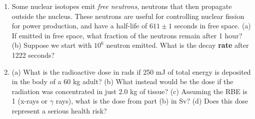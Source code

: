 \documentclass[12pt,twocolumn]{article}
\begin{document}
\begin{enumerate}
\item Some nuclear isotopes emit \textit{free neutrons}, neutrons that then propagate outside the nucleus.  These neutrons are useful for controlling nuclear fission for power production, and have a half-life of $611\pm 1$ seconds in free space.  (a) If emitted in free space, what fraction of the neutrons remain after 1 hour? (b) Suppose we start with $10^6$ neutron emitted.  What is the decay \textbf{rate} after 1222 seconds? \\ \vspace{3cm}
\item (a) What is the radioactive dose in rads if 250 mJ of total energy is deposited in the body of a 60 kg adult? (b) What instead would be the dose if the radiation was concentrated in just 2.0 kg of tissue? (c) Assuming the RBE is 1 (x-rays or $\gamma$ rays), what is the dose from part (b) in Sv? (d) Does this dose represent a serious health risk? \\ \vspace{2cm}
\end{enumerate}
\end{document}
